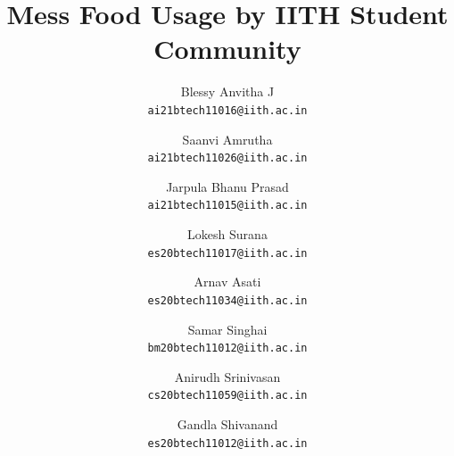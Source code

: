 \documentclass{article}
\begin{document}
\title{\textbf{Mess Food Usage by IITH Student Community}} 
\author{Blessy Anvitha J\\ \texttt{ai21btech11016@iith.ac.in} \and Saanvi Amrutha \\ \texttt{ai21btech11026@iith.ac.in} \and Jarpula Bhanu Prasad \\ \texttt{ai21btech11015@iith.ac.in} \and 	Lokesh Surana \\ \texttt{es20btech11017@iith.ac.in} \and Arnav Asati \\ \texttt{es20btech11034@iith.ac.in} \and Samar Singhai \\ \texttt{bm20btech11012@iith.ac.in} \and Anirudh Srinivasan \\ \texttt{cs20btech11059@iith.ac.in} \and Gandla Shivanand \\ \texttt{es20btech11012@iith.ac.in}} 
     


     
\maketitle
\bigskip
\end{document}
